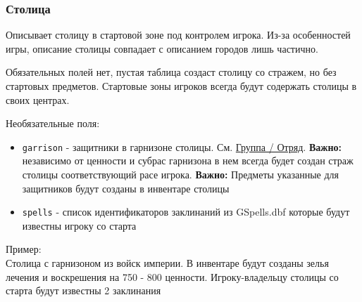 \subsubsection{Столица}
\label{capital}
Описывает столицу в стартовой зоне под контролем игрока. Из-за особенностей игры, описание столицы совпадает с описанием городов лишь частично.

Обязательных полей нет, пустая таблица создаст столицу со стражем, но без стартовых предметов. Стартовые зоны игроков всегда будут содержать столицы в своих центрах.

Необязательные поля:
\begin{itemize}
\item \texttt{garrison} - защитники в гарнизоне столицы. См. \hyperref[group]{Группа / Отряд}. \textbf{Важно:} независимо от ценности и субрас гарнизона в нем всегда будет создан страж столицы соответствующий расе игрока. \textbf{Важно:} Предметы указанные для защитников будут созданы в инвентаре столицы
\item \texttt{spells} - список идентификаторов заклинаний из GSpells.dbf которые будут известны игроку со старта
\end{itemize}

Пример:\\
Столица с гарнизоном из войск империи.
В инвентаре будут созданы зелья лечения и воскрешения на 750 - 800 ценности.
Игроку-владельцу столицы со старта будут известны 2 заклинания

\begin{figure}[H]

\end{figure}